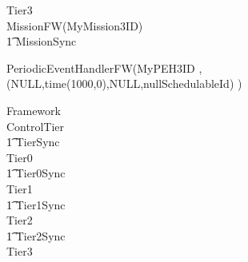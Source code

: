 %
\begin{circus}
\circprocess Tier3 \circdef \\

\circblockopen
	MissionFW(MyMission3ID)\\
		\t1 	\lpar MissionSync \rpar \\
		\circblockopen











			PeriodicEventHandlerFW(MyPEH3ID ,(NULL,time(1000,0),NULL,nullSchedulableId)   )\\
		\circblockclose
\circblockclose
\end{circus}
%
%
%
\begin{circus}
\circprocess Framework \circdef \\
\circblockopen
ControlTier \\
\t1 \lpar TierSync \rpar \\
 \circblockopen
Tier0
\\ \t1 \lpar Tier0Sync \rpar \\
Tier1
\\ \t1 \lpar Tier1Sync \rpar \\
Tier2
\\ \t1 \lpar Tier2Sync \rpar \\
Tier3
\circblockclose
\circblockclose
\end{circus}
%
%
